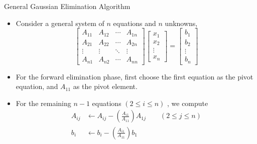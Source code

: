 \documentclass{beamer}
\newcommand{\beforeverb}{\footnotesize}
\newcommand{\afterverb}{\normalsize}
\begin{document}
\begin{frame}{General Gaussian Elimination Algorithm}
\begin{itemize}
\item Consider a general system of $n$ equations and $n$ unknowns,
\beforeverb
\[
\left[ 
\begin{array}{cccc}
A_{11} & A_{12} & \cdots & A_{1n} \\
A_{21} & A_{22} & \cdots & A_{2n} \\
\vdots & \vdots & \ddots & \vdots \\
A_{n1} & A_{n2} & \cdots & A_{nn} 
\end{array}
\right]
\left[
\begin{array}{c}
x_1\\
x_2\\
\vdots\\
x_n
\end{array}
\right]
=
\left[
\begin{array}{c}
b_1\\
b_2\\
\vdots\\
b_n
\end{array}
\right]
\]
\afterverb 

\item For the forward elimination phase, first choose the first equation as the \alert{pivot equation}, and $A_{11}$ as the \alert{pivot element}. 
\item For the remaining $n-1$ equations $(2\le i \le n)$ , we compute 
\beforeverb
\begin{align*}
A_{ij}&\leftarrow A_{ij}- \left(\frac{A_{i1}}{A_{11}}\right)A_{1j}\quad \quad (2\le j\le n)\\
b_i &\leftarrow  b_i- \left(\frac{A_{i1}}{A_{11}}\right)b_1
\end{align*}
\afterverb
\end{itemize}

\end{frame}
\end{document}
